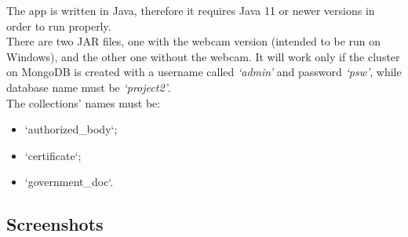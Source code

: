 \documentclass[12pt, a4paper]{article}
\begin{document}
The app is written in Java, therefore it requires Java 11 or newer versions in order to 
run properly. \\
There are two JAR files, one with the webcam version (intended to be run on Windows), 
and the other one without the webcam. 
It will work only if the cluster on MongoDB is created with a username called 
\emph{‘admin’} and password \emph{‘psw’}, while database name must be \emph{‘project2’}. \\
The collections' names must be: 
\begin{itemize}
    \item ‘authorized\_body‘;
    \item ‘certificate‘;
    \item ‘government\_doc‘.
\end{itemize}


\clearpage %

\subsection{Screenshots}
\end{document}
